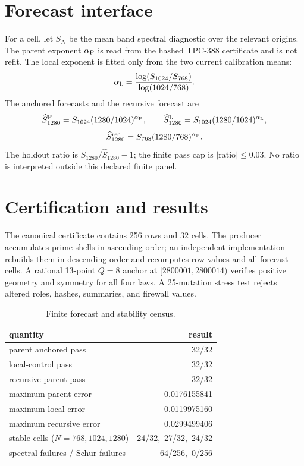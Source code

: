 \documentclass[10pt]{article}
\begin{document}
\section{Forecast interface}

For a cell, let $S_N$ be the mean band spectral diagnostic over the relevant
origins.  The parent exponent $\alpha_{\rm P}$ is read from the hashed
TPC-388 certificate and is not refit.  The local exponent is fitted only from
the two current calibration means:
\[
 \alpha_{\rm L}=
 \frac{\log(S_{1024}/S_{768})}{\log(1024/768)}.
\]
The anchored forecasts and the recursive forecast are
\[
 \widehat S_{1280}^{\rm P}
   =S_{1024}(1280/1024)^{\alpha_{\rm P}},\qquad
 \widehat S_{1280}^{\rm L}
   =S_{1024}(1280/1024)^{\alpha_{\rm L}},
\]
\[
 \widehat S_{1280}^{\rm rec}
   =S_{768}(1280/768)^{\alpha_{\rm P}}.
\]
The holdout ratio is $S_{1280}/\widehat S_{1280}-1$; the finite pass cap is
$|\text{ratio}|\leq0.03$.  No ratio is interpreted outside this declared
finite panel.

\section{Certification and results}

The canonical certificate contains 256 rows and 32 cells.  The producer
accumulates prime shells in ascending order; an independent implementation
rebuilds them in descending order and recomputes row values and all forecast
cells.  A rational 13-point $Q=8$ anchor at
$[2800001,2800014)$ verifies positive geometry and symmetry for all four laws.
A 25-mutation stress test rejects altered roles, hashes, summaries, and
firewall values.

\begin{table}[t]
\centering
\caption{Finite forecast and stability census.}
\small
\begin{tabular}{@{}l r@{}}
\toprule
quantity & result\\
\midrule
parent anchored pass & 32/32\\
local-control pass & 32/32\\
recursive parent pass & 32/32\\
maximum parent error & 0.0176155841\\
maximum local error & 0.0119975160\\
maximum recursive error & 0.0299499406\\
stable cells ($N=768,1024,1280$) & 24/32,\ 27/32,\ 24/32\\
spectral failures / Schur failures & 64/256,\ 0/256\\
\bottomrule
\end{tabular}
\end{table}
\end{document}
